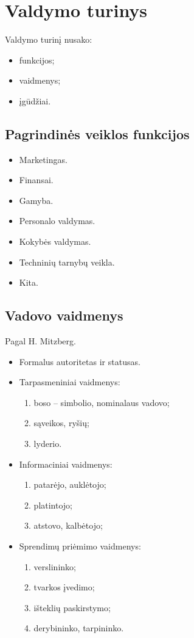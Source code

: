 \section{Valdymo turinys}

Valdymo turinį nusako:
\begin{itemize}
  \item funkcijos;
  \item vaidmenys;
  \item įgūdžiai.
\end{itemize}

\subsection{Pagrindinės veiklos funkcijos}

\begin{itemize}
  \item Marketingas.
  \item Finansai.
  \item Gamyba.
  \item Personalo valdymas.
  \item Kokybės valdymas.
  \item Techninių tarnybų veikla.
  \item Kita.
\end{itemize}

\subsection{Vadovo vaidmenys}

Pagal H. Mitzberg.

\begin{itemize}
  \item Formalus autoritetas ir statusas.
  \item Tarpasmeniniai vaidmenys:
    \begin{enumerate}
      \item boso – simbolio, nominalaus vadovo;
      \item sąveikos, ryšių;
      \item lyderio.
    \end{enumerate}
  \item Informaciniai vaidmenys:
    \begin{enumerate}
      \item patarėjo, auklėtojo;
      \item platintojo;
      \item atstovo, kalbėtojo;
    \end{enumerate}
  \item Sprendimų priėmimo vaidmenys:
    \begin{enumerate}
      \item verslininko;
      \item tvarkos įvedimo;
      \item išteklių paskirstymo;
      \item derybininko, tarpininko.
    \end{enumerate}
\end{itemize}

